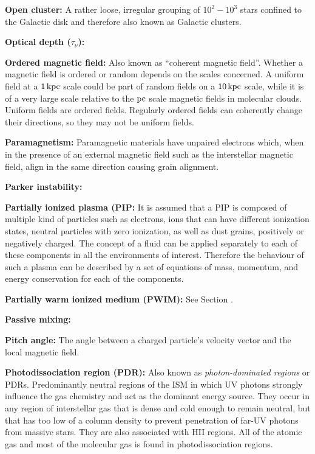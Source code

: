 \documentclass[a4paper,10pt]{article}
\begin{document}
{\noindent}\textbf{Open cluster:} A rather loose, irregular grouping of $10^2-10^3$ stars confined to the Galactic disk and therefore also known as Galactic clusters. 

{\noindent}\textbf{Optical depth ($\tau_\nu$):} 

{\noindent}\textbf{Ordered magnetic field:} Also known as ``coherent magnetic field''. Whether a magnetic field is ordered or random depends on the scales concerned. A uniform field at a $1\,{\rm kpc}$ scale could be part of random fields on a $10\,{\rm kpc}$ scale, while it is of a very large scale relative to the $\rm pc$ scale magnetic fields in molecular clouds. Uniform fields are ordered fields. Regularly ordered fields can coherently change their directions, so they may not be uniform fields. 

{\noindent}\textbf{Paramagnetism:} Paramagnetic materials have unpaired electrons which, when in the presence of an external magnetic field such as the interstellar magnetic field, align in the same direction causing grain alignment.

{\noindent}\textbf{Parker instability:}

{\noindent}\textbf{Partially ionized plasma (PIP:} It is assumed that a PIP is composed of multiple kind of particles such as electrons, ions that can have different ionization states, neutral particles with zero ionization, as well as dust grains, positively or negatively charged. The concept of a fluid can be applied separately to each of these components in all the environments of interest. Therefore the behaviour of such a plasma can be described by a set of equations of mass, momentum, and energy conservation for each of the components. 

{\noindent}\textbf{Partially warm ionized medium (PWIM):} See Section \label{sec:ism}. 

{\noindent}\textbf{Passive mixing:}

{\noindent}\textbf{Pitch angle:} The angle between a charged particle's velocity vector and the local magnetic field.

{\noindent}\textbf{Photodissociation region (PDR):} Also known as \textit{photon-dominated regions} or PDRs. Predominantly neutral regions of the ISM in which UV photons strongly influence the gas chemistry and act as the dominant energy source. They occur in any region of interstellar gas that is dense and cold enough to remain neutral, but that has too low of a column density to prevent penetration of far-UV photons from massive stars. They are also associated with HII regions. All of the atomic gas and most of the molecular gas is found in photodissociation regions.
\end{document}
